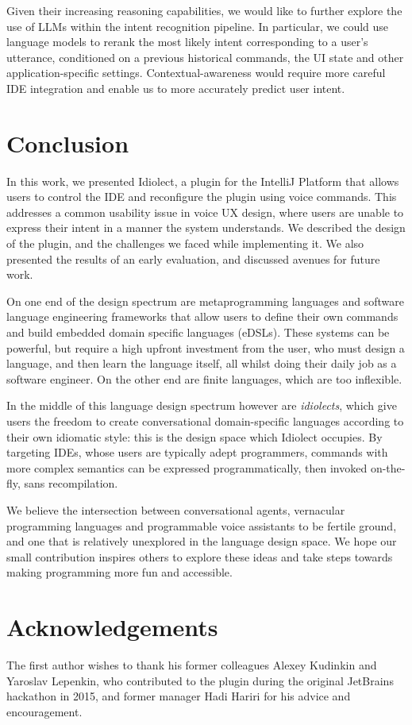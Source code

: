 \documentclass[conference]{IEEEtran}
\begin{document}
Given their increasing reasoning capabilities, we would like to further explore the use of LLMs within the intent recognition pipeline. In particular, we could use language models to rerank the most likely intent corresponding to a user's utterance, conditioned on a previous historical commands, the UI state and other application-specific settings. Contextual-awareness would require more careful IDE integration and enable us to more accurately predict user intent.

\section{Conclusion}

In this work, we presented Idiolect, a plugin for the IntelliJ Platform that allows users to control the IDE and reconfigure the plugin using voice commands. This addresses a common usability issue in voice UX design, where users are unable to express their intent in a manner the system understands. We described the design of the plugin, and the challenges we faced while implementing it. We also presented the results of an early evaluation, and discussed avenues for future work.

On one end of the design spectrum are metaprogramming languages and software language engineering frameworks that allow users to define their own commands and build embedded domain specific languages (eDSLs). These systems can be powerful, but require a high upfront investment from the user, who must design a language, and then learn the language itself, all whilst doing their daily job as a software engineer. On the other end are finite languages, which are too inflexible.

In the middle of this language design spectrum however are \textit{idiolects}, which give users the freedom to create conversational domain-specific languages according to their own idiomatic style: this is the design space which Idiolect occupies. By targeting IDEs, whose users are typically adept programmers, commands with more complex semantics can be expressed programmatically, then invoked on-the-fly, sans recompilation.

We believe the intersection between conversational agents, vernacular programming languages and programmable voice assistants to be fertile ground, and one that is relatively unexplored in the language design space. We hope our small contribution inspires others to explore these ideas and take steps towards making programming more fun and accessible.

\section{Acknowledgements}

The first author wishes to thank his former colleagues Alexey Kudinkin and Yaroslav Lepenkin, who contributed to the plugin during the original JetBrains hackathon in 2015, and former manager Hadi Hariri for his advice and encouragement.


\end{document}
